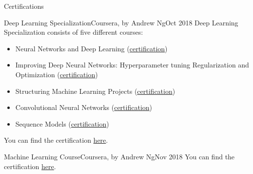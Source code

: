 \documentclass[]{mcdowellcv}
\begin{document}
    \newpage
	\begin{cvsection}{Certifications}
    		\begin{cvsubsection}{Deep Learning Specialization}{Coursera, by Andrew Ng}{Oct 2018}
                Deep Learning Specialization consists of five different courses:
    			\begin{itemize}
                \item Neural Networks and Deep Learning (\href{https://www.coursera.org/account/accomplishments/certificate/Q466THNX9825}{certification})
                \item Improving Deep Neural Networks: Hyperparameter tuning Regularization and Optimization (\href{https://www.coursera.org/account/accomplishments/verify/BKWJS632W3V8}{certification})
    			\item Structuring Machine Learning Projects (\href{https://www.coursera.org/account/accomplishments/certificate/UEF3FJTFZSFD}{certification})
    			\item Convolutional Neural Networks (\href{https://www.coursera.org/account/accomplishments/certificate/MEWWQGYXJX2M}{certification})
    			\item Sequence Models (\href{https://www.coursera.org/account/accomplishments/certificate/RDANP785FVS6}{certification})
    			\end{itemize}
    			You can find the certification \href{https://www.coursera.org/account/accomplishments/specialization/certificate/XCRZ9PFYVLNH}{here}.
    		\end{cvsubsection}
    		
    		\begin{cvsubsection}{Machine Learning Course}{Coursera, by Andrew Ng}{Nov 2018}
                You can find the certification \href{https://www.coursera.org/account/accomplishments/verify/JN6PYQVTHEGB}{here}.
    		\end{cvsubsection}
    		

\end{cvsection}
\end{document}
